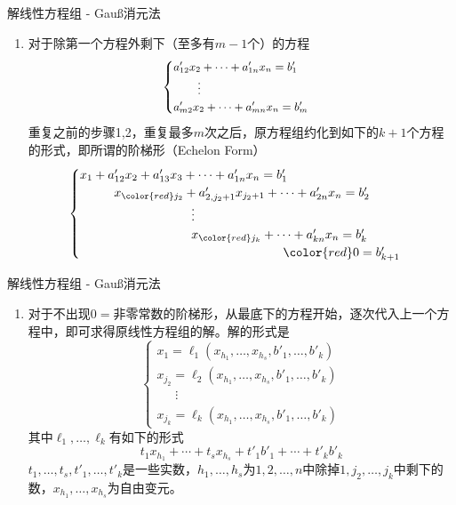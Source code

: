 \begin{frame}{解线性方程组 - Gau{\ss}消元法}

\begin{enumerate}\addtocounter{enumi}{2}
\item 对于除第一个方程外剩下（{\color{red}至多}有$m-1$个）的方程
\[
\small
\begin{cases}
a'_{12}x_2 + \cdots + a'_{1n}x_n = b'_1 \\
\phantom{yyyy} \vdots \\
a'_{m2}x_2 + \cdots + a'_{mn}x_n = b'_m
\end{cases}\]
重复之前的步骤1,2，重复最多$m$次之后，原方程组约化到如下的$k+1$个方程的形式，即所谓的阶梯形（Echelon Form）
\[
\begin{cases}
x_1 + a'_{12}x_2 + a'_{13}x_3 + \cdots + a'_{1n}x_n = b'_1 \\
\phantom{x_1 + 1} x_{\color{red} j_2} + a'_{2,j_2+1}x_{j_2+1} + \cdots + a'_{2n}x_n = b'_2 \\
\phantom{yyyyyyyyyyyyyyyyy} \vdots \\
\phantom{yyyyyyyyyyyyyyyyy} x_{\color{red} j_k} + \cdots + a'_{kn}x_n = b'_k \\
\phantom{yyyyyyyyyyyyyyyyyyyyyyyyyyyyyyy} {\color{red} 0 = b'_{k+1}}
\end{cases}\]
\end{enumerate}

\end{frame}


\begin{frame}{解线性方程组 - Gau{\ss}消元法}

\begin{enumerate}\addtocounter{enumi}{3}
\item 对于{\color{red}不出现$0 = $非零常数的阶梯形}，从最底下的方程开始，逐次代入上一个方程中，即可求得原线性方程组的解。解的形式是
\[\begin{cases}
x_1 = \ell_1(x_{h_1},\ldots,x_{h_s},b'_1,\ldots,b'_k) \\
x_{j_2} = \ell_2(x_{h_1},\ldots,x_{h_s},b'_1,\ldots,b'_k) \\
\phantom{yyy} \vdots \\
x_{j_k} = \ell_k(x_{h_1},\ldots,x_{h_s},b'_1,\ldots,b'_k)
\end{cases}\]
其中$\ell_1,\ldots,\ell_k$有如下的形式
\[t_1x_{h_1}+\cdots+t_sx_{h_s}+t'_1b'_1+\cdots+t'_kb'_k\]
$t_1,\ldots,t_s,t'_1,\ldots,t'_k$是一些实数，$h_1,\ldots,h_s$为$1,2,\ldots,n$中除掉$1,j_2,\ldots,j_k$中剩下的数，$x_{h_1},\ldots,x_{h_s}$为自由变元。
\end{enumerate}

\end{frame}

